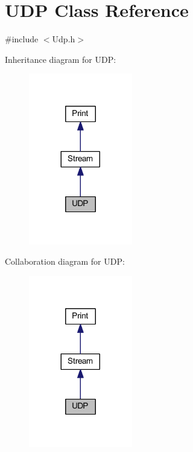\hypertarget{class_u_d_p}{}\section{U\+D\+P Class Reference}
\label{class_u_d_p}


{\ttfamily \#include $<$Udp.\+h$>$}



Inheritance diagram for U\+D\+P\+:
\nopagebreak
\begin{figure}[H]
\begin{center}
\leavevmode
\includegraphics[width=128pt]{class_u_d_p__inherit__graph}
\end{center}
\end{figure}


Collaboration diagram for U\+D\+P\+:
\nopagebreak
\begin{figure}[H]
\begin{center}
\leavevmode
\includegraphics[width=128pt]{class_u_d_p__coll__graph}
\end{center}
\end{figure}
